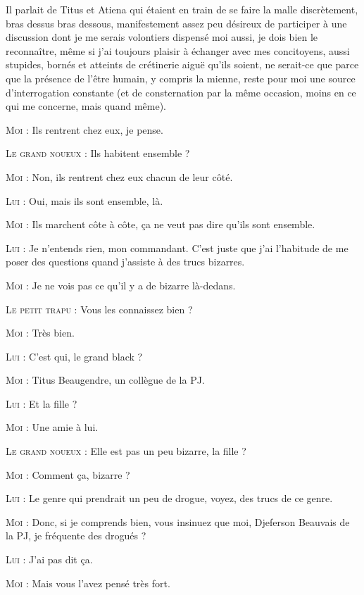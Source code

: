 Il parlait de Titus et Atiena qui étaient en train de se faire la malle discrètement, bras dessus bras dessous, manifestement assez peu désireux de participer à une discussion dont je me serais volontiers dispensé moi aussi, je dois bien le reconnaître, même si j’ai toujours plaisir à échanger avec mes concitoyens, aussi stupides, bornés et atteints de crétinerie aiguë qu’ils soient, ne serait-ce que parce que la présence de l’être humain, y compris la mienne, reste pour moi une source d’interrogation constante (et de consternation par la même occasion, moins en ce qui me concerne, mais quand même).

\begin{dialogue}

\textsc{Moi} : Ils rentrent chez eux, je pense.

\textsc{Le grand noueux} : Ils habitent ensemble ?

\textsc{Moi} : Non, ils rentrent chez eux chacun de leur côté.

\textsc{Lui} : Oui, mais ils sont ensemble, là.

\textsc{Moi} : Ils marchent côte à côte, ça ne veut pas dire qu’ils sont ensemble.

\textsc{Lui} : Je n’entends rien, mon commandant. C’est juste que j’ai l’habitude de me poser des questions quand j’assiste à des trucs bizarres.

\textsc{Moi} : Je ne vois pas ce qu’il y a de bizarre là-dedans.

\textsc{Le petit trapu} : Vous les connaissez bien ?

\textsc{Moi} : Très bien.

\textsc{Lui} : C’est qui, le grand black ?

\textsc{Moi} : Titus Beaugendre, un collègue de la PJ.

\textsc{Lui} : Et la fille ?

\textsc{Moi} : Une amie à lui.

\textsc{Le grand noueux} : Elle est pas un peu bizarre, la fille ?

\textsc{Moi} : Comment ça, bizarre ?

\textsc{Lui} : Le genre qui prendrait un peu de drogue, voyez, des trucs de ce genre.

\textsc{Moi} : Donc, si je comprends bien, vous insinuez que moi, Djeferson Beauvais de la PJ, je fréquente des drogués ?

\textsc{Lui} : J’ai pas dit ça.

\textsc{Moi} : Mais vous l’avez pensé très fort.


\end{dialogue}
